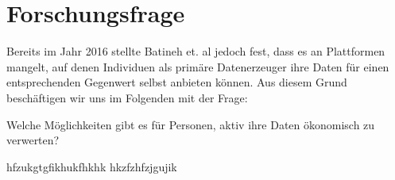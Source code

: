 \section{Forschungsfrage}

Bereits im Jahr 2016 stellte Batineh et. al jedoch fest, dass es an Plattformen mangelt, auf denen Individuen als primäre Datenerzeuger ihre Daten für einen entsprechenden Gegenwert selbst anbieten können. \cite{monetizingData_2016} Aus diesem Grund beschäftigen wir uns im Folgenden mit der Frage:

\begin{center} 
Welche Möglichkeiten gibt es für Personen, aktiv ihre Daten ökonomisch zu verwerten? 
\end{center}

hfzukgtgfikhukfhkhk
hkzfzhfzjgujik